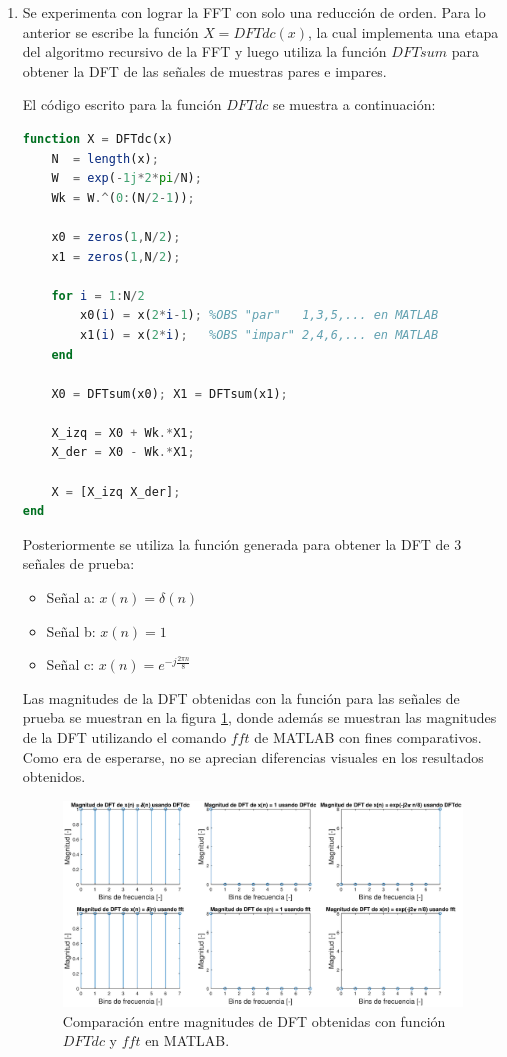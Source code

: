 \begin{enumerate}
\item Se experimenta con lograr la FFT con solo una reducción de orden. Para lo anterior se escribe la función $X = DFTdc(x)$, la cual implementa una etapa del algoritmo recursivo de la FFT y luego utiliza la función $DFTsum$ para obtener la DFT de las señales de muestras pares e impares.

El código escrito para la función $DFTdc$ se muestra a continuación:
\begin{lstlisting}[language = octave]
function X = DFTdc(x)
    N  = length(x);
    W  = exp(-1j*2*pi/N);
    Wk = W.^(0:(N/2-1));
    
    x0 = zeros(1,N/2);
    x1 = zeros(1,N/2);
    
    for i = 1:N/2
        x0(i) = x(2*i-1); %OBS "par"   1,3,5,... en MATLAB
        x1(i) = x(2*i);   %OBS "impar" 2,4,6,... en MATLAB       
    end
    
    X0 = DFTsum(x0); X1 = DFTsum(x1);
    
    X_izq = X0 + Wk.*X1;
    X_der = X0 - Wk.*X1;
    
    X = [X_izq X_der];    
end
\end{lstlisting}

Posteriormente se utiliza la función generada para obtener la DFT de 3 señales de prueba:
\begin{itemize}
    \item Señal a: $x(n) = \delta(n)$
    \item Señal b: $x(n) = 1$
    \item Señal c: $x(n) = e^{-j\frac{2\pi n}{8}}$
\end{itemize}

Las magnitudes de la DFT obtenidas con la función para las señales de prueba se muestran en la figura \ref{p6_1dft}, donde además se muestran las magnitudes de la DFT utilizando el comando $fft$ de MATLAB con fines comparativos. Como era de esperarse, no se aprecian diferencias visuales en los resultados obtenidos.

\begin{figure}[H]
    \centering
    \includegraphics[width = .98 \linewidth]{Figuras/p6_1dft.eps}
    \caption{Comparación entre magnitudes de DFT obtenidas con función $DFTdc$ y $fft$ en MATLAB.}
    \label{p6_1dft}
\end{figure}


\end{enumerate}
